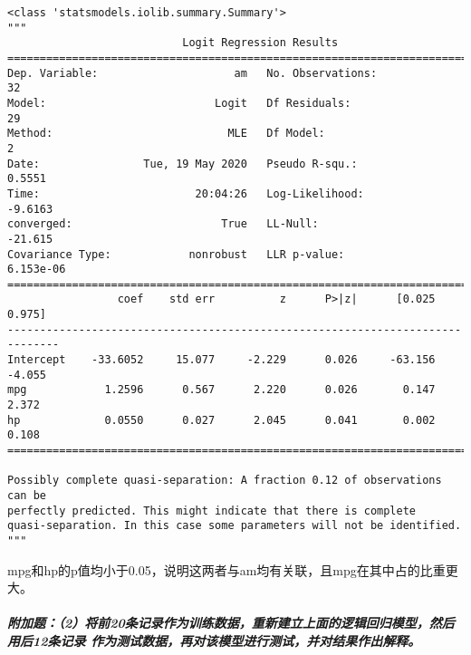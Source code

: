 \documentclass[11pt]{article}
\makeatletter
\newcommand{\boxspacing}{\kern\kvtcb@left@rule\kern\kvtcb@boxsep}
\newcommand{\prompt}[4]{
        \ttfamily\llap{{\color{#2}[#3]:\hspace{3pt}#4}}\vspace{-\baselineskip}
    }
\makeatother
\begin{document}
            \begin{tcolorbox}[breakable, size=fbox, boxrule=.5pt, pad at break*=1mm, opacityfill=0]
\prompt{Out}{outcolor}{29}{\boxspacing}
\begin{Verbatim}[commandchars=\\\{\}]
<class 'statsmodels.iolib.summary.Summary'>
"""
                           Logit Regression Results
==============================================================================
Dep. Variable:                     am   No. Observations:                   32
Model:                          Logit   Df Residuals:                       29
Method:                           MLE   Df Model:                            2
Date:                Tue, 19 May 2020   Pseudo R-squ.:                  0.5551
Time:                        20:04:26   Log-Likelihood:                -9.6163
converged:                       True   LL-Null:                       -21.615
Covariance Type:            nonrobust   LLR p-value:                 6.153e-06
==============================================================================
                 coef    std err          z      P>|z|      [0.025      0.975]
------------------------------------------------------------------------------
Intercept    -33.6052     15.077     -2.229      0.026     -63.156      -4.055
mpg            1.2596      0.567      2.220      0.026       0.147       2.372
hp             0.0550      0.027      2.045      0.041       0.002       0.108
==============================================================================

Possibly complete quasi-separation: A fraction 0.12 of observations can be
perfectly predicted. This might indicate that there is complete
quasi-separation. In this case some parameters will not be identified.
"""
\end{Verbatim}
\end{tcolorbox}
        
    mpg和hp的p值均小于0.05，说明这两者与am均有关联，且mpg在其中占的比重更大。

    \hypertarget{ux9644ux52a0ux98982ux5c06ux524d20ux6761ux8bb0ux5f55ux4f5cux4e3aux8badux7ec3ux6570ux636eux91cdux65b0ux5efaux7acbux4e0aux9762ux7684ux903bux8f91ux56deux5f52ux6a21ux578bux7136ux540eux7528ux540e12ux6761ux8bb0ux5f55ux4f5cux4e3aux6d4bux8bd5ux6570ux636eux518dux5bf9ux8be5ux6a21ux578bux8fdbux884cux6d4bux8bd5ux5e76ux5bf9ux7ed3ux679cux4f5cux51faux89e3ux91ca}{%
\subparagraph{附加题：（2）将前20条记录作为训练数据，重新建立上面的逻辑回归模型，然后用后12条记录
作为测试数据，再对该模型进行测试，并对结果作出解释。}\label{ux9644ux52a0ux98982ux5c06ux524d20ux6761ux8bb0ux5f55ux4f5cux4e3aux8badux7ec3ux6570ux636eux91cdux65b0ux5efaux7acbux4e0aux9762ux7684ux903bux8f91ux56deux5f52ux6a21ux578bux7136ux540eux7528ux540e12ux6761ux8bb0ux5f55ux4f5cux4e3aux6d4bux8bd5ux6570ux636eux518dux5bf9ux8be5ux6a21ux578bux8fdbux884cux6d4bux8bd5ux5e76ux5bf9ux7ed3ux679cux4f5cux51faux89e3ux91ca}}
\end{document}
